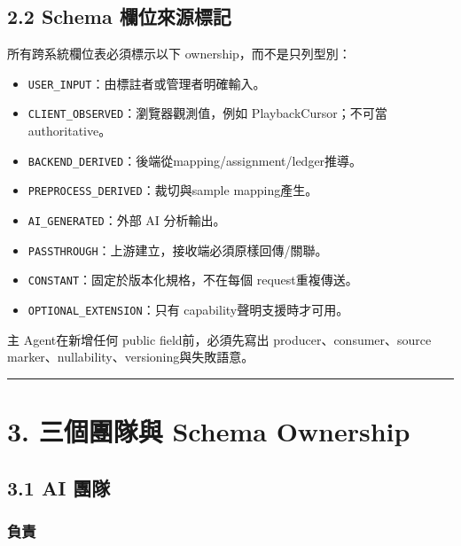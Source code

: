 \documentclass[
  9pt,
  a4paper,
]{article}
\providecommand{\tightlist}{%
  \setlength{\itemsep}{0pt}\setlength{\parskip}{0pt}}
\begin{document}
\subsection{2.2 Schema
欄位來源標記}\label{22-schema-ux6b04ux4f4dux4f86ux6e90ux6a19ux8a18}

所有跨系統欄位表必須標示以下 ownership，而不是只列型別：

\begin{itemize}
\tightlist
\item
  \texttt{USER\_\allowbreak{}INPUT}：由標註者或管理者明確輸入。
\item
  \texttt{CLIENT\_\allowbreak{}OBSERVED}：瀏覽器觀測值，例如 PlaybackCursor；不可當
  authoritative。
\item
  \texttt{BACKEND\_\allowbreak{}DERIVED}：後端從mapping/assignment/ledger推導。
\item
  \texttt{PREPROCESS\_\allowbreak{}DERIVED}：裁切與sample mapping產生。
\item
  \texttt{AI\_\allowbreak{}GENERATED}：外部 AI 分析輸出。
\item
  \texttt{PASSTHROUGH}：上游建立，接收端必須原樣回傳/關聯。
\item
  \texttt{CONSTANT}：固定於版本化規格，不在每個 request重複傳送。
\item
  \texttt{OPTIONAL\_\allowbreak{}EXTENSION}：只有 capability聲明支援時才可用。
\end{itemize}

主 Agent在新增任何 public field前，必須先寫出 producer、consumer、source
marker、nullability、versioning與失敗語意。

\begin{center}\rule{0.5\linewidth}{0.5pt}\end{center}

\section{3. 三個團隊與 Schema
Ownership}\label{3-ux4e09ux500bux5718ux968aux8207-schema-ownership}

\subsection{3.1 AI 團隊}\label{31-ai-ux5718ux968a}

\subsubsection{負責}\label{ux8ca0ux8cac}
\end{document}
